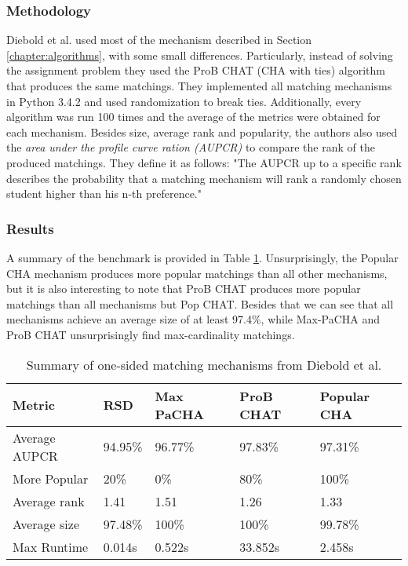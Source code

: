 \subsubsection{Methodology}
Diebold et al. used most of the mechanism described in Section \ref{chapter:algorithms}, with some small differences. Particularly, instead of solving the assignment problem they used the ProB CHAT (CHA with ties) algorithm that produces the same matchings. They implemented all matching mechanisms in Python 3.4.2 and used randomization to break ties. Additionally, every algorithm was run 100 times and the average of the metrics were obtained for each mechanism. 
Besides size, average rank and popularity, the authors also used the \emph{area under the profile curve ration (AUPCR)} to compare the rank of the produced matchings. They define it as follows: "The AUPCR up to a specific rank describes the probability that a matching mechanism will rank a randomly chosen student higher than his n-th preference."\cite{DieboldBenchmark}

\subsubsection{Results}
A summary of the benchmark is provided in Table \ref{tab:diebold-benchmark}. Unsurprisingly, the Popular CHA mechanism produces more popular matchings than all other mechanisms, but it is also interesting to note that ProB CHAT produces more popular matchings than all mechanisms but Pop CHAT. Besides that we can see that all mechanisms achieve an average size of at least 97.4\%, while Max-PaCHA and ProB CHAT unsurprisingly find max-cardinality matchings.

\begin{table}[h!]
    \centering 
    \begin{tabular}{|l|l|l|l|l|}
        \hline
        Metric & RSD & Max PaCHA & ProB CHAT & Popular CHA \\ \hline
        Average AUPCR & 94.95\% & 96.77\% & \cellcolor[HTML]{9AFF99}97.83\% & 97.31\% \\ \hline
        More Popular & 20\% & 0\% & 80\% & \cellcolor[HTML]{9AFF99}100\% \\ \hline
        Average rank & 1.41 & 1.51 & \cellcolor[HTML]{9AFF99}1.26 & 1.33 \\ \hline
        Average size & 97.48\% & \cellcolor[HTML]{9AFF99}100\% & \cellcolor[HTML]{9AFF99}100\% & 99.78\% \\ \hline
        Max Runtime & \cellcolor[HTML]{9AFF99}0.014s & 0.522s & \cellcolor[HTML]{FFCCC9}33.852s & 2.458s \\ \hline
        \end{tabular}
    \caption{Summary of one-sided matching mechanisms from Diebold et al. \cite{DieboldBenchmark}}
    \label{tab:diebold-benchmark}
\end{table}

